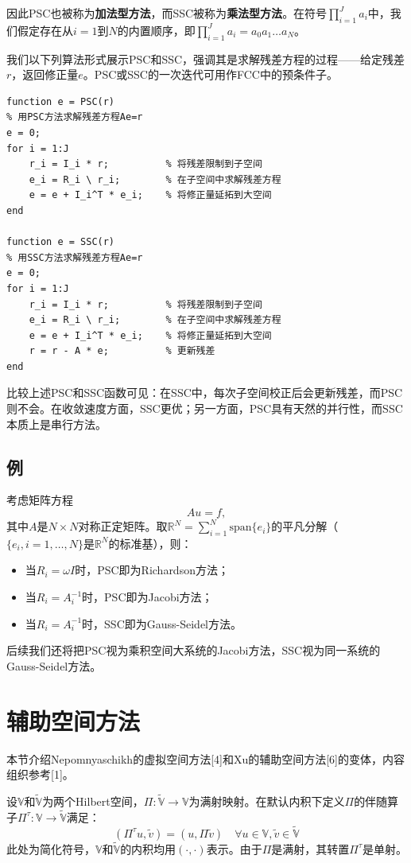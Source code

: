 \documentclass[letterpaper,12pt]{article}
\begin{document}
因此PSC也被称为\textbf{加法型方法}，而SSC被称为\textbf{乘法型方法}。在符号$\prod_{i=1}^{J}a_{i}$中，我们假定存在从$i=1$到$N$的内置顺序，即$\prod_{i=1}^{J}a_{i}=a_{0}a_{1}\ldots a_{N}$。

我们以下列算法形式展示PSC和SSC，强调其是求解残差方程的过程——给定残差$r$，返回修正量$e$。PSC或SSC的一次迭代可用作FCC中的预条件子。

\begin{verbatim}
function e = PSC(r)
% 用PSC方法求解残差方程Ae=r
e = 0;
for i = 1:J
    r_i = I_i * r;          % 将残差限制到子空间
    e_i = R_i \ r_i;        % 在子空间中求解残差方程
    e = e + I_i^T * e_i;    % 将修正量延拓到大空间
end

function e = SSC(r)
% 用SSC方法求解残差方程Ae=r
e = 0;
for i = 1:J
    r_i = I_i * r;          % 将残差限制到子空间
    e_i = R_i \ r_i;        % 在子空间中求解残差方程
    e = e + I_i^T * e_i;    % 将修正量延拓到大空间
    r = r - A * e;          % 更新残差
end
\end{verbatim}

比较上述PSC和SSC函数可见：在SSC中，每次子空间校正后会更新残差，而PSC则不会。在收敛速度方面，SSC更优；另一方面，PSC具有天然的并行性，而SSC本质上是串行方法。

\subsection{例}
考虑矩阵方程
\[ Au=f, \]
其中$A$是$N\times N$对称正定矩阵。取$\mathbb{R}^{N}=\sum_{i=1}^{N}\text{span}\{e_{i}\}$的平凡分解（$\{e_{i},i=1,\ldots,N\}$是$\mathbb{R}^{N}$的标准基），则：

\begin{itemize}
    \item 当$R_{i}=\omega I$时，PSC即为Richardson方法；
    \item 当$R_{i}=A_{i}^{-1}$时，PSC即为Jacobi方法；
    \item 当$R_{i}=A_{i}^{-1}$时，SSC即为Gauss-Seidel方法。
\end{itemize}

后续我们还将把PSC视为乘积空间大系统的Jacobi方法，SSC视为同一系统的Gauss-Seidel方法。

\section{辅助空间方法}

本节介绍Nepomnyaschikh的虚拟空间方法[4]和Xu的辅助空间方法[6]的变体，内容组织参考[1]。

设$\mathbb{\mathbb{V}}$和$\tilde{\mathbb{\mathbb{V}}}$为两个Hilbert空间，$\Pi:\tilde{\mathbb{\mathbb{V}}}\to\mathbb{\mathbb{V}}$为满射映射。在默认内积下定义$\Pi$的伴随算子$\Pi^{\tau}:\mathbb{\mathbb{V}}\to\tilde{\mathbb{\mathbb{V}}}$满足：
\[ (\Pi^{\tau}u,\tilde{v}) = (u,\Pi\tilde{v}) \quad \forall u\in\mathbb{\mathbb{V}}, \tilde{v}\in\tilde{\mathbb{\mathbb{V}}} \]
此处为简化符号，$\mathbb{\mathbb{V}}$和$\tilde{\mathbb{\mathbb{V}}}$的内积均用$(\cdot,\cdot)$表示。由于$\Pi$是满射，其转置$\Pi^{\tau}$是单射。
\end{document}
